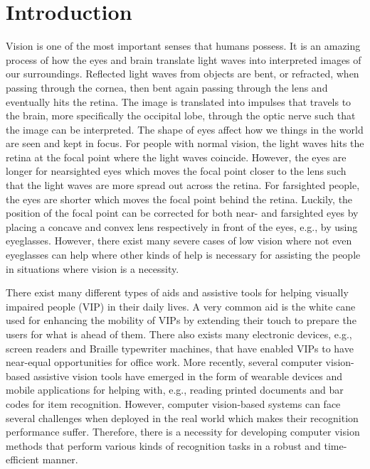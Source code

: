 
\chapter{Introduction}
\label{chap:introduction}

Vision is one of the most important senses that humans possess. It is an amazing process of how the eyes and brain translate light waves into interpreted images of our surroundings. Reflected light waves from objects are bent, or refracted, when passing through the cornea, then bent again passing through the lens and eventually hits the retina. The image is translated into impulses that travels to the brain, more specifically the occipital lobe, through the optic nerve such that the image can be interpreted. The shape of eyes affect how we things in the world are seen and kept in focus. For people with normal vision, the light waves hits the retina at the focal point where the light waves coincide. However, the eyes are longer for nearsighted eyes which moves the focal point closer to the lens such that the light waves are more spread out across the retina. For farsighted people, the eyes are shorter which moves the focal point behind the retina. Luckily, the position of the focal point can be corrected for both near- and farsighted eyes by placing a concave and convex lens respectively in front of the eyes, e.g., by using eyeglasses. However, there exist many severe cases of low vision where not even eyeglasses can help where other kinds of help is necessary for assisting the people in situations where vision is a necessity. 

There exist many different types of aids and assistive tools for helping visually impaired people (VIP) in their daily lives. A very common aid is the white cane used for enhancing the mobility of VIPs by extending their touch to prepare the users for what is ahead of them. There also exists many electronic devices, e.g., screen readers and Braille typewriter machines, that have enabled VIPs to have near-equal opportunities for office work. More recently, several computer vision-based assistive vision tools have emerged in the form of wearable devices and mobile applications for helping with, e.g., reading printed documents and bar codes for item recognition. However, computer vision-based systems can face several challenges when deployed in the real world which makes their recognition performance suffer. Therefore, there is a necessity for developing computer vision methods that perform various kinds of recognition tasks in a robust and time-efficient manner. 




